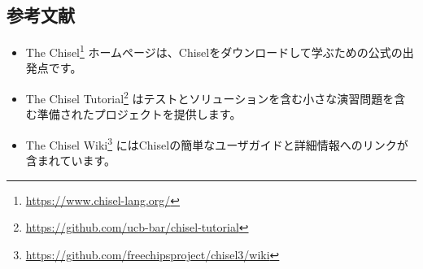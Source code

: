 \documentclass[%
    10pt,
    headinclude, footexclude,
    openright, %
    notitlepage,
    cleardoubleempty,
    headsepline,
    pointlessnumbers,
    bibtotoc, idxtotoc,
    ]{scrbook}
\newif\ifshoworiginal
\newif\ifshowtrans
\newcommand{\myref}[2]{\href{#1}{#2}}
\renewcommand{\myref}[2]{{#2}{\footnote{\url{#1}}}}
\begin{document}
\begin{flushleft}
\section{参考文献}
\fi

\ifshoworiginal
Here a list of further reading for digital design and Chisel:
\begin{itemize}
\item \myref{http://www.cambridge.org/es/academic/subjects/engineering/circuits-and-systems/digital-design-systems-approach}{Digital Design: A Systems Approach}, by William J. Dally and R. Curtis Harting,
is a modern textbook on digital design. It is available in two versions: using Verilog or VHDL as a hardware description language.
\end{itemize}
\fi

\ifshowtrans %
デジタル回路設計とChiselに関する参考文献をリストします
\begin{itemize}
\item \myref{http://www.cambridge.org/es/academic/subjects/engineering/circuits-and-systems/digital-design-systems-approach}{Digital Design: A Systems Approach}, by William J. Dally and R. Curtis Harting,
は、デジタル回路設計に関する最新の教科書です。ハードウェア記述言語としてVerilogとVHDLの2つのバージョンがあります。
\end{itemize}
\fi

\ifshoworiginal
The official Chisel documentation and further documents are available online:
\fi

\ifshowtrans %
Chiselの公式ドキュメントやその他の関連ドキュメントはオンラインで利用可能です。
\fi

\begin{itemize}

\item The \myref{https://www.chisel-lang.org/}{Chisel}
ホームページは、Chiselをダウンロードして学ぶための公式の出発点です。

\item The \myref{https://github.com/ucb-bar/chisel-tutorial}{Chisel Tutorial}
はテストとソリューションを含む小さな演習問題を含む準備されたプロジェクトを提供します。

\item The \myref{https://github.com/freechipsproject/chisel3/wiki}{Chisel Wiki}
にはChiselの簡単なユーザガイドと詳細情報へのリンクが含まれています。


\end{itemize}
\end{flushleft}
\end{document}
